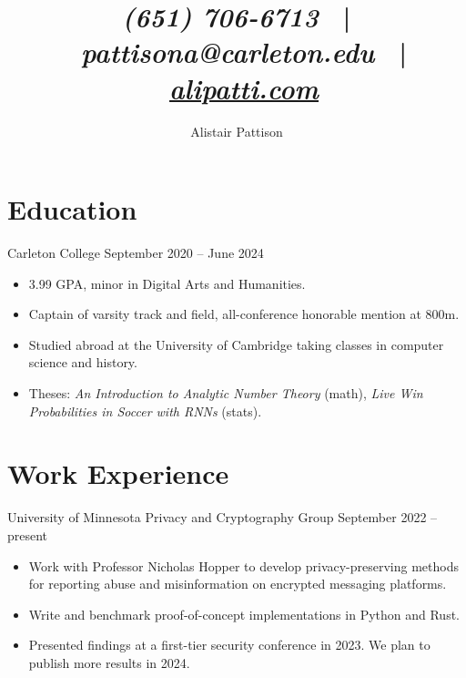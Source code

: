 \documentclass{resume}
\author{Alistair Pattison}
\title{
{\it (651) 706-6713}
\ | \
{\it pattisona@carleton.edu}
\ | \
\href{http://alipatti.com}{\it alipatti.com}
}
\begin{document}
\maketitle

\section{Education}

{Carleton College}
{September 2020 -- June 2024}

\begin{itemize}
	\item 3.99 GPA,  minor in Digital Arts and Humanities.
	\item Captain of varsity track and field, all-conference honorable mention at 800m.
	\item Studied abroad at the University of Cambridge taking classes in computer science and history.
	\item Theses:
	      \textit{An Introduction to Analytic Number Theory} (math),
	      \textit{Live Win Probabilities in Soccer with RNNs} (stats).
\end{itemize}

%

\section{Work Experience}

{University of Minnesota Privacy and Cryptography Group}
{September 2022 -- present}

\begin{itemize}
	\item Work with Professor Nicholas Hopper to develop privacy-preserving methods for reporting abuse and misinformation on encrypted messaging platforms.
	\item Write and benchmark proof-of-concept implementations in Python and Rust.
	\item Presented findings at a first-tier security conference in 2023. We plan to publish more results in 2024.
\end{itemize}
\end{document}
